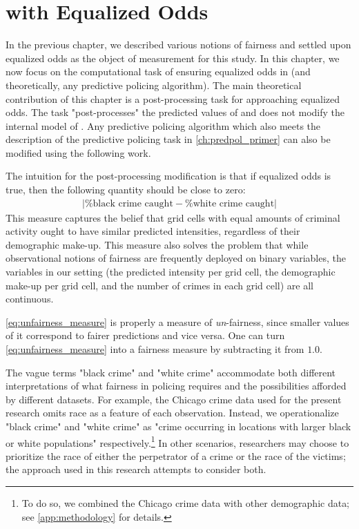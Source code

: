 \chapter{\pp with Equalized Odds}\label{ch:fairpol}

In the previous chapter, we described various notions of fairness and settled upon equalized odds as the object of measurement for this study. In this chapter, we now focus on the computational task of ensuring equalized odds in \pp (and theoretically, any predictive policing algorithm). The main theoretical contribution of this chapter is a post-processing task for approaching equalized odds. The task "post-processes" the predicted values of \pp and does not modify the internal model of \pp. Any predictive policing algorithm which also meets the description of the predictive policing task in \autoref{ch:predpol_primer} can also be modified using the following work.

The intuition for the post-processing modification is that if equalized odds is true, then the following quantity should be close to zero:
\begin{align}
    \left|\text{\% black crime caught} - \text{\% white crime caught}\right| \label{eq:unfairness_measure}
\end{align}
This measure captures the belief that grid cells with equal amounts of criminal activity ought to have similar predicted intensities, regardless of their demographic make-up. This measure also solves the problem that while observational notions of fairness are frequently deployed on binary variables, the variables in our setting (the predicted intensity per grid cell, the demographic make-up per grid cell, and the number of crimes in each grid cell) are all continuous.

\autoref{eq:unfairness_measure} is properly a measure of \emph{un}-fairness, since smaller values of it correspond to fairer predictions and vice versa. One can turn \autoref{eq:unfairness_measure} into a fairness measure by subtracting it from $1.0$.

The vague terms "black crime" and "white crime" accommodate both different interpretations of what fairness in policing requires and the possibilities afforded by different datasets. For example, the Chicago crime data used for the present research omits race as a feature of each observation. Instead, we operationalize "black crime" and "white crime" as "crime occurring in locations with larger black or white populations" respectively.\footnote{To do so, we combined the Chicago crime data with other demographic data; see \autoref{app:methodology} for details.} In other scenarios, researchers may choose to prioritize the race of either the perpetrator of a crime or the race of the victims; the approach used in this research attempts to consider both.

